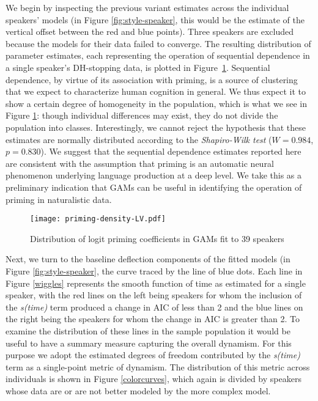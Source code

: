 \documentclass[12pt]{article}
\begin{document}
We begin by inspecting the previous variant estimates across the individual speakers' models (in Figure \ref{fig:style-speaker}, this would be the estimate of the vertical offset between the red and blue points). 
Three speakers are excluded because the models for their data failed to converge.
The resulting distribution of parameter estimates, each representing the operation of sequential dependence in a single speaker's DH-stopping data, is plotted in
Figure~\ref{fig:prime-dist}.
Sequential dependence, by virtue of its association with priming, is a source of clustering that we expect to characterize human cognition in general. We thus expect it to show a certain degree of homogeneity in the population, which is what we see in Figure \ref{fig:prime-dist}: though individual differences may exist, they do not divide the population into classes. 
Interestingly, we cannot reject the hypothesis that these estimates are normally distributed according to the \emph{Shapiro-Wilk test} ($W = 0.984$, $p = 0.830$). We suggest that the sequential dependence estimates reported here are  consistent with the assumption that priming is an automatic neural phenomenon underlying language production at a deep level. We take this as a preliminary indication that GAMs can be useful in identifying the operation of priming in naturalistic data.  

\begin{figure}
    \centering
    \texttt{[image: priming-density-LV.pdf]}
    \caption{Distribution of logit priming coefficients in GAMs fit to 39 speakers} 
    \label{fig:prime-dist}
\end{figure}


Next, we turn to the baseline deflection components of the fitted models (in Figure \ref{fig:style-speaker}, the curve traced by the line of blue dots.
Each line in Figure \ref{wiggles} represents the smooth function of time as estimated for a single speaker, with the red lines on the left being speakers for whom the inclusion of the \emph{s(time)} term produced a change in AIC of less than 2 and the blue lines on the right being the speakers for whom the change in AIC is greater than 2. To examine the distribution of these lines in the sample population it would be useful to have a summary measure capturing the overall dynamism. For this purpose we adopt the estimated degrees of freedom contributed by the \emph{s(time)} term as a single-point metric of dynamism. The distribution of this metric across individuals is shown in Figure \ref{colorcurves}, which again is divided by speakers whose data are or are not better modeled by the more complex model.
\end{document}

